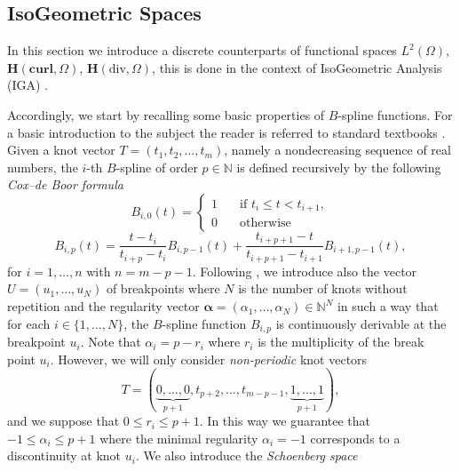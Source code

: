 \subsection{IsoGeometric Spaces}\label{subsec-IGA}
In this section we introduce a discrete counterparts of functional spaces $L^2(\Omega)$, $\bm{H}(\textbf{curl},\Omega)$, $\bm{H}(\text{div},\Omega)$, this is done in the context of IsoGeometric Analysis (IGA) \cite{bazilevs2006isogeometric,buffa2011isogeometric,cottrell2009isogeometric,da2014mathematical,hughes2005isogeometric}. 

Accordingly, we start by recalling some basic properties of $B$-spline functions. For a basic introduction to the subject the reader is referred to standard textbooks \cite{cohen2001geometric,farin1999nurbs,farin2002curves,gu2008computational,piegl1996nurbs,prautzsch2002bezier,rogers2001introduction,schumaker2007spline}. Given a knot vector $T=(t_1,t_2,\ldots,t_{m})$, namely a nondecreasing sequence of real numbers, the $i$-th $B$-spline of order $p \in \mathbb{N}$ is defined recursively  by the following {\em Cox–de Boor formula} 
\begin{equation*}
B_{i,0}(t) = 
\begin{cases}
1 \quad &\text{if } t_i \leq t < t_{i+1},\\
0 \quad &\text{otherwise}
\end{cases}
\end{equation*}
\begin{equation*}
B_{i,p}(t)=\frac{t - t_i}{t_{i+p}-t_i} B_{i,p-1}(t) + \frac{t_{i+p+1} - t}{t_{i+p+1}-t_{i+1}} B_{i+1,p-1}(t), 
\end{equation*}
for $i=1, \ldots, n$ with $n=m-p-1$. Following \cite{buffa2011isogeometric}, we introduce also the vector $U=(u_1,\ldots,u_N)$ of breakpoints where $N$ is the number of knots without repetition and the regularity vector $\bm{\alpha}=(\alpha_1, \ldots, \alpha_N) \in \mathbb{N}^N$ in such a way that for each $i \in \{ 1,\ldots,N\}$, the $B$-spline function $B_{i,p}$ is continuously derivable at the breakpoint $u_i$. Note that $\alpha_i=p-r_i$ where $r_i$ is the multiplicity of the break point $u_i$. However, we will only consider  {\em non-periodic} knot vectors
\begin{equation*}
T=(\underbrace{0,\ldots,0}_{p+1}, t_{p+2}, \ldots, t_{m-p-1}, \underbrace{1,\ldots,1}_{p+1}),
\end{equation*}  
and we suppose that $0 \leq r_i \leq p+1$. In this way we guarantee that $-1 \leq \alpha_i \leq p+1$ where the minimal regularity $\alpha_i=-1$ corresponds to a discontinuity at knot $u_i$. We also introduce the {\em Schoenberg space} 
